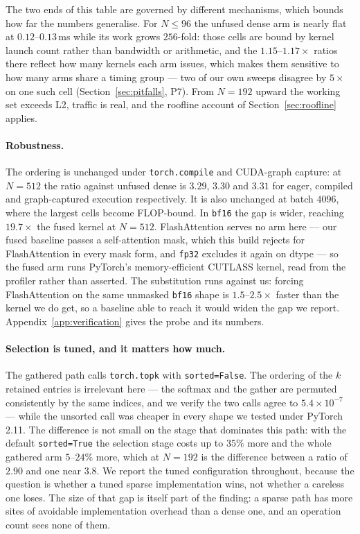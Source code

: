 The two ends of this table are governed by different mechanisms, which bounds
how far the numbers generalise. For $N \le 96$ the unfused dense arm is nearly
flat at $0.12$--$0.13$\,ms while its work grows $256$-fold: those cells are
bound by kernel launch count rather than bandwidth or arithmetic, and the
$1.15$--$1.17\times$ ratios there reflect how many kernels each arm issues,
which makes them sensitive to how many arms share a timing group --- two of our
own sweeps disagree by $5\times$ on one such cell (Section~\ref{sec:pitfalls},
P7). From $N{=}192$ upward the working set exceeds L2, traffic is real, and the
roofline account of Section~\ref{sec:roofline} applies.

\paragraph{Robustness.} The ordering is unchanged under \texttt{torch.compile}
and CUDA-graph capture: at $N{=}512$ the ratio against unfused dense is
$3.29$, $3.30$ and $3.31$ for eager, compiled and graph-captured execution
respectively. It is also unchanged at batch $4096$, where the largest cells
become FLOP-bound. In \texttt{bf16} the gap is wider, reaching $19.7\times$ the
fused kernel at $N{=}512$. FlashAttention serves no arm here --- our fused
baseline passes a self-attention mask, which this build rejects for
FlashAttention in every mask form, and \texttt{fp32} excludes it again on dtype
--- so the fused arm runs PyTorch's memory-efficient CUTLASS kernel, read from
the profiler rather than asserted. The substitution runs against us: forcing
FlashAttention on the same unmasked \texttt{bf16} shape is $1.5$--$2.5\times$
faster than the kernel we do get, so a baseline able to reach it would widen
the gap we report. Appendix~\ref{app:verification} gives the probe and its
numbers.

\paragraph{Selection is tuned, and it matters how much.} The gathered path
calls \texttt{torch.topk} with \texttt{sorted=False}. The ordering of the $k$
retained entries is irrelevant here --- the softmax and the gather are permuted
consistently by the same indices, and we verify the two calls agree to
$5.4\times10^{-7}$ --- while the unsorted call was cheaper in every shape we
tested under PyTorch 2.11. The difference is not small on the stage that
dominates this path: with the default \texttt{sorted=True} the selection stage
costs up to $35\%$ more and the whole gathered arm $5$--$24\%$ more, which at
$N{=}192$ is the difference between a ratio of $2.90$ and one near $3.8$. We
report the tuned configuration throughout, because the question is whether a
tuned sparse implementation wins, not whether a careless one loses. The size of
that gap is itself part of the finding: a sparse path has more sites of
avoidable implementation overhead than a dense one, and an operation count sees
none of them.

